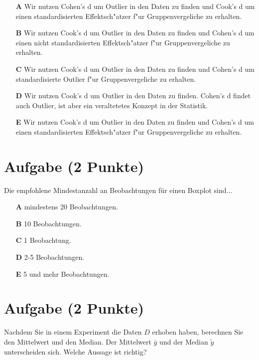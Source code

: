 \documentclass[a4paper, 9pt]{scrartcl}\usepackage[]{graphicx}\usepackage[]{xcolor}
\begin{document}
\begin{enumerate}
\item [\textbf{A} \msquare] Wir nutzen Cohen's d um Outlier in den Daten zu finden und Cook's d um einen standardisierten Effektsch{"a}tzer f{"u}r Gruppenvergeliche zu erhalten.
\item [\textbf{B} \msquare] Wir nutzen Cook's d um Outlier in den Daten zu finden und Cohen's d um einen nicht standardisierten Effektsch{"a}tzer f{"u}r Gruppenvergeliche zu erhalten.
\item [\textbf{C} \msquare] Wir nutzen Cook's d um Outlier in den Daten zu finden und Cohen's d um standardisierte Outlier f{"u}r Gruppenvergeliche zu erhalten.
\item [\textbf{D} \msquare] Wir nutzen Cook's d um Outlier in den Daten zu finden. Cohen's d findet auch Outlier, ist aber ein veraltetetes Konzept in der Statistik.
\item [\textbf{E} \msquare] Wir nutzen Cook's d um Outlier in den Daten zu finden und Cohen's d um einen standardisierten Effektsch{"a}tzer f{"u}r Gruppenvergeliche zu erhalten.
\end{enumerate}

\section{Aufgabe \hfill (2 Punkte)}



Die empfohlene Mindestanzahl an Beobachtungen f{\"u}r einen Boxplot sind...



\begin{enumerate}
\item [\textbf{A} \msquare] mindestens 20 Beobachtungen.
\item [\textbf{B} \msquare] 10 Beobachtungen.
\item [\textbf{C} \msquare] 1 Beobachtung.
\item [\textbf{D} \msquare] 2-5 Beobachtungen.
\item [\textbf{E} \msquare] 5 und mehr Beobachtungen.
\end{enumerate} 

\section{Aufgabe \hfill (2 Punkte)}



Nachdem Sie in einem Experiment die Daten $D$ erhoben haben, berechnen Sie den
Mittelwert und den Median. Der Mittelwert $\bar{y}$ und der Median
$\tilde{y}$ unterscheiden sich. Welche Aussage ist richtig?
\end{document}

